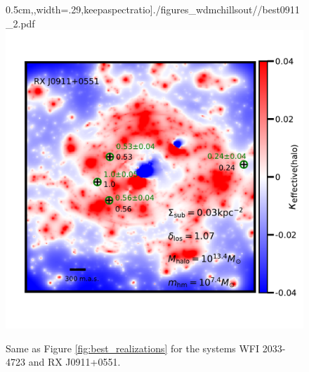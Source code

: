 \begin{figure}
	0.5cm,,width=.29\textwidth,keepaspectratio]{./figures_wdmchillsout//best0911_2.pdf}
	\includegraphics[clip,trim=1cm 2.3cm 0.3cm
	2.2cm,width=.34\textwidth,keepaspectratio]{./figures_wdmchillsout//best0911_3.pdf}
	\caption[Maps of the \textit{effective multi-plane convergence} for several realizations of dark matter halos cont.]{\label{fig:best_realizations2} Same as Figure \ref{fig:best_realizations} for the systems WFI 2033-4723 and RX J0911+0551.}
\end{figure}

